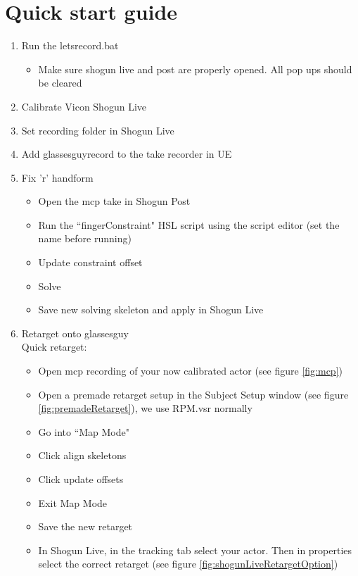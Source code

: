 \documentclass{uva-inf-article}
\begin{document}
\section{Quick start guide}
\begin{enumerate}
    \item Run the letsrecord.bat
    \begin{itemize}
        \item Make sure shogun live and post are properly opened. All pop ups should be cleared
    \end{itemize}
    \item Calibrate Vicon Shogun Live
    \item Set recording folder in Shogun Live
    \item Add glassesguyrecord to the take recorder in UE
    \item Fix 'r' handform\\
    \begin{itemize}
        \item Open the mcp take in Shogun Post
        \item Run the ``fingerConstraint" HSL script using the script editor (set the name before running)
        \item Update constraint offset
        \item Solve
        \item Save new solving skeleton and apply in Shogun Live
    \end{itemize}
    \item Retarget onto glassesguy\\Quick retarget:
    \begin{itemize}
        \item Open mcp recording of your now calibrated actor (see figure \ref{fig:mcp})
        \item Open a premade retarget setup in the Subject Setup window (see figure \ref{fig:premadeRetarget}), we use RPM.vsr normally
        \item Go into ``Map Mode"
        \item Click align skeletons
        \item Click update offsets
        \item Exit Map Mode
        \item Save the new retarget
        \item In Shogun Live, in the tracking tab select your actor. Then in properties select the correct retarget (see figure \ref{fig:shogunLiveRetargetOption})

\end{itemize}
\end{enumerate}
\end{document}
